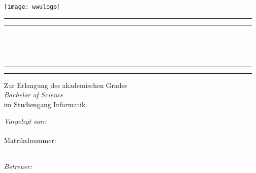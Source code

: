 \pagestyle{plain}
\begin{centering}
\texttt{[image: wwulogo]}



\vspace{2cm} 
{
\begin{spacing}{0.15}
{\rule{\linewidth}{.3mm}} \newline  
{\rule{\linewidth}{.2mm}} \\[0.7cm]
\end{spacing}
}

{\LARGE\sffamily
	\textbf{\tTitle}\\[0.7cm]
}
{
	\begin{spacing}{0.15}
		{\rule{\linewidth}{.2mm}} \newline  
		{\rule{\linewidth}{.3mm}} 
	\end{spacing}
}

\vspace{45pt}

{\normalsize\sffamily
	Zur Erlangung des akademischen Grades \\ \textit{Bachelor of Science}\\ im Studiengang Informatik\\[3cm]
}

\hspace*{30pt}
\begin{minipage}[t]{.9\linewidth}
\begin{minipage}[t]{.34\textwidth}
{\sffamily	\textit{Vorgelegt von:} \\
{\large  \sffamily	 \textbf{\tAuthor}}}\\
{\normalsize\sffamily Matrikelnummer: \tStudentId\\
\tMail}\\[1cm]
\end{minipage} 
\hspace{110pt} 
			\begin{minipage}[t]{.38\textwidth}
					\textit{\sffamily Betreuer:}\\	
			\textbf{\large \sffamily \tReviewer}	\\
				{\normalsize\sffamily \tReviewerMail}\\[0.1cm] 
			\textbf{\large\sffamily  		\tSecondAdviser}\\
				{\normalsize\sffamily   \tSecondAdviserMail}\\			
			\end{minipage}
\end{minipage}
\ \\[2cm]
                               

\end{centering}
